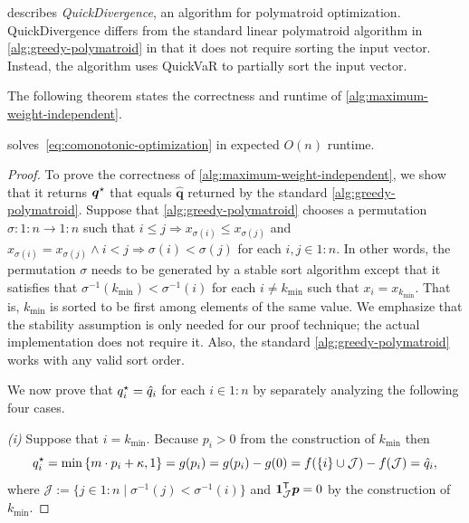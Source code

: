  describes \emph{QuickDivergence}, an algorithm for polymatroid optimization. QuickDivergence differs from the standard linear polymatroid algorithm in \cref{alg:greedy-polymatroid} in that it does not require sorting the input vector. Instead, the algorithm uses QuickVaR to partially sort the input vector.

The following theorem states the correctness and runtime of \cref{alg:maximum-weight-independent}. 
\begin{theorem} \label{thm:quickdivergence-correct}
   solves~\eqref{eq:comonotonic-optimization} in expected $O(n)$ runtime.
\end{theorem}
\begin{proof}
To prove the correctness of \cref{alg:maximum-weight-independent}, we show that it returns $\bm{q}^{\star}$ that equals $\hat{\bm{q}}$ returned by the standard \cref{alg:greedy-polymatroid}.  Suppose that \cref{alg:greedy-polymatroid} chooses a permutation $\sigma\colon  1{:}n \to 1{:}n$ such that $i \le j \Rightarrow x_{\sigma(i)} \le x_{\sigma(j)}$ and $x_{\sigma(i)} = x_{\sigma(j)} \wedge i < j \Rightarrow \sigma(i) < \sigma(j)$ for each $i,j\in 1{:}n$. In other words, the permutation $\sigma$ needs to be generated by a stable sort algorithm except that it satisfies that $\sigma^{-1}(k_{\min}) < \sigma^{-1}(i)$ for each $i \neq k_{\min}$ such that $x_i = x_{k_{\min}}$. That is, $k_{\min}$ is sorted to be first among elements of the same value. We emphasize that the stability assumption is only needed for our proof technique; the actual implementation does not require it. Also, the standard \cref{alg:greedy-polymatroid} works with any valid sort order. 

We now prove that $q^{\star}_i = \hat{q}_i$ for each $i\in 1{:}n$ by separately analyzing the following four cases.

\emph{(i)} Suppose that $i = k_{\min}$. Because $p_i > 0$ from the construction of $k_{\min}$ then
\[
  q^{\star}_i = \min \left\{   m\cdot p_i + \kappa, 1 \right\} = g(p_i) =  g(p_i) - g(0) = f(\{ i \} \cup \mathcal{J}) - f(\mathcal{J})  = \hat{q}_i,
\]
where $\mathcal{J} := \{ j \in 1{:}n \mid \sigma^{-1}(j) < \sigma^{-1}(i) \}$ and $\bm{1}_{\mathcal{J}}^{\mathsf{T}} \bm{p} = 0$ by the construction of $k_{\min}$.


\end{proof}
